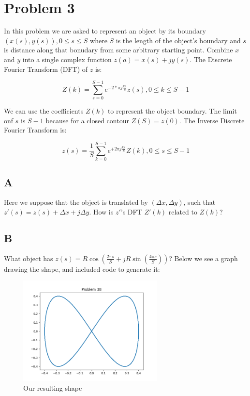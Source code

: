 \documentclass{article}
\begin{document}
\section*{Problem 3}

In this problem we are asked to represent an object by its boundary $(x(s),y(s)),0\leq s\leq S$ where $S$ is the length of the object's boundary and $s$ is distance along that bonudary from some arbitrary starting point. Combine $x$ and $y$ into a single complex function $z(a)=x(s)+jy(s)$. The Discrete Fourier Transform (DFT) of $z$ is:

\begin{equation}
    Z(k) = \sum^{S-1}_{s=0} e^{-2*\pi j \frac{ks}{S}} z(s), 0\leq k \leq S-1
\end{equation}

We can use the coefficients $Z(k)$ to represent the object boundary. The limit onf $s$ is $S-1$ because for a closed contour $Z(S)=z(0)$. The Inverse Discrete Fourier Transform is:

\begin{equation}
    z(s) = \frac{1}{S} \sum_{k=0}^{S-1} e^{+2\pi j \frac{ks}{S}} Z(k), 0 \leq s \leq S-1
\end{equation}

\subsection*{A}

Here we suppose that the object is translated by $(\Delta x, \Delta y)$, such that $z'(s) = z(s) + \Delta x + j \Delta y$. How is $z'$'s DFT $Z'(k)$ related to $Z(k)$? 

\subsection*{B}

What object has $z(s) = R \cos(\frac{2\pi s}{S} + jR \sin(\frac{4\pi s}{S}))$? Below we see a graph drawing the shape, and included code to generate it:

\begin{figure}[H]
    \centering
    \includegraphics[width = 0.65\textwidth]{imgs/prob3_b.png}
    \caption{Our resulting shape}
    \label{fig:prob3-b}
\end{figure}
\end{document}
